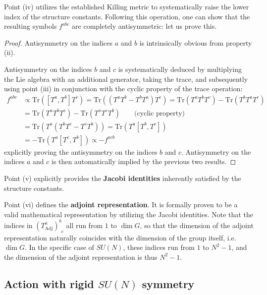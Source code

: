 Point (iv) utilizes the established Killing metric to systematically raise the lower index of the structure constants. Following this operation, one can show that the resulting symbols \(f^{abc}\) are completely antisymmetric: let us prove this.
\begin{proof}
    Antisymmetry on the indices \(a\) and \(b\) is intrinsically obvious from property (ii).

    Antisymmetry on the indices \(b\) and \(c\) is systematically deduced by multiplying the Lie algebra with an additional generator, taking the trace, and subsequently using point (iii) in conjunction with the cyclic property of the trace operation:
    \[
        \begin{aligned}
            f^{abc} & \propto \text{Tr}([T^a, T^b] T^c) = \text{Tr}((T^a T^b - T^b T^a) T^c) = \text{Tr}(T^a T^b T^c) - \text{Tr}(T^b T^a T^c) \\
                    & = \text{Tr}(T^a T^b T^c) - \text{Tr}(T^a T^c T^b) \qquad \text{(cyclic property)}                                        \\
                    & = \text{Tr}(T^a (T^b T^c - T^c T^b)) = \text{Tr}(T^a [T^b, T^c])                                                         \\
                    & = -\text{Tr}(T^a [T^c, T^b])  \propto -f^{acb}
        \end{aligned}
    \]
    explicitly proving the antisymmetry on the indices \(b\) and \(c\). Antisymmetry on the indices \(a\) and \(c\) is then automatically implied by the previous two results.
\end{proof}

Point (v) explicitly provides the \textbf{Jacobi identities} inherently satisfied by the structure constants.

Point (vi) defines the \textbf{adjoint representation}. It is formally proven to be a valid mathematical representation by utilizing the Jacobi identities. Note that the indices in \((T_{\mathrm{Adj}}^a)^b_{\phantom{b}c}\) all run from \(1\) to \(\dim G\), so that the dimension of the adjoint representation naturally coincides with the dimension of the group itself, i.e. \(\dim G\). In the specific case of \(SU(N)\), these indices run from \(1\) to \(N^2 - 1\), and the dimension of the adjoint representation is thus \(N^2 - 1\).

\subsection{Action with rigid \(SU(N)\) symmetry}

